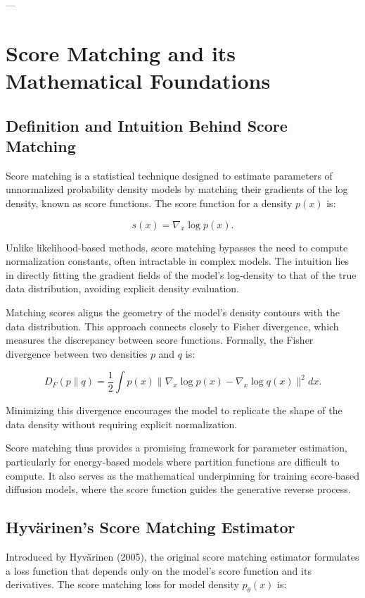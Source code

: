 \documentclass[a4paper,12pt,oneside]{memoir}
\begin{document}
---

\chapter{Score Matching and its Mathematical Foundations}

\section{Definition and Intuition Behind Score Matching}

Score matching is a statistical technique designed to estimate parameters of unnormalized probability density models by matching their gradients of the log density, known as score functions. The score function for a density \( p(x) \) is:

\[
s(x) = \nabla_x \log p(x).
\]

Unlike likelihood-based methods, score matching bypasses the need to compute normalization constants, often intractable in complex models. The intuition lies in directly fitting the gradient fields of the model's log-density to that of the true data distribution, avoiding explicit density evaluation.

Matching scores aligns the geometry of the model's density contours with the data distribution. This approach connects closely to Fisher divergence, which measures the discrepancy between score functions. Formally, the Fisher divergence between two densities \( p \) and \( q \) is:

\[
D_F(p \| q) = \frac{1}{2} \int p(x) \| \nabla_x \log p(x) - \nabla_x \log q(x) \|^2 dx.
\]

Minimizing this divergence encourages the model to replicate the shape of the data density without requiring explicit normalization.

Score matching thus provides a promising framework for parameter estimation, particularly for energy-based models where partition functions are difficult to compute. It also serves as the mathematical underpinning for training score-based diffusion models, where the score function guides the generative reverse process.

\section{Hyvärinen’s Score Matching Estimator}

Introduced by Hyvärinen (2005), the original score matching estimator formulates a loss function that depends only on the model's score function and its derivatives. The score matching loss for model density \( p_\theta(x) \) is:
\end{document}
